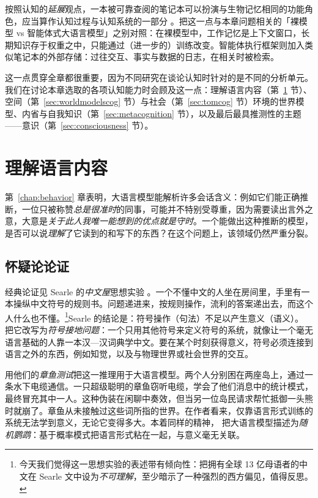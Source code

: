 按照认知的\emph{延展}观点，一本被可靠查阅的笔记本可以扮演与生物记忆相同的功能角色，应当算作认知过程与认知系统的一部分 \citep{clark1998extended}。把这一点与本章问题相关的「裸模型 vs 智能体式大语言模型」之别对照：在裸模型中，工作记忆是上下文窗口，长期知识存于权重之中，只能通过（进一步的）训练改变。智能体执行框架则加入类似笔记本的外部存储：过往交互、事实与数据的日志，在相关时被检索。

这一点贯穿全章都很重要，因为不同研究在谈论认知时针对的是不同的分析单元。我们在讨论本章选取的各项认知能力时会顾及这一点：理解语言内容（第~\ref{sec:understanding} 节）、空间（第~\ref{sec:worldmodelscog} 节）与社会（第~\ref{sec:tomcog} 节）环境的世界模型、内省与自我知识（第~\ref{sec:metacognition} 节），以及最后最具推测性的主题——意识（第~\ref{sec:consciousness} 节）。

\section{理解语言内容}\label{sec:understanding}
第~\ref{chap:behavior} 章表明，大语言模型能解析许多会话含义：例如它们能正确推断，一位只被称赞{\em 总是很准时}的同事，可能并不特别受尊重，因为需要读出言外之意，大意是\emph{关于此人我唯一能想到的优点就是守时}。一个能做出这种推断的模型，是否可以说\emph{理解}了它读到的和写下的东西？在这个问题上，该领域仍然严重分裂。

\subsection{怀疑论论证}
经典论证见 Searle 的\emph{中文屋}思想实验 \citep{searle1980minds}。一个不懂中文的人坐在房间里，手里有一本操纵中文符号的规则书。问题递进来，按规则操作，流利的答案递出去，而这个人什么也不懂。\footnote{今天我们觉得这一思想实验的表述带有倾向性：把拥有全球 13 亿母语者的中文在 Searle 文中设为\emph{不可理解}，至少暗示了一种强烈的西方偏见，值得反思。}Searle 的结论是：符号操作（句法）不足以产生意义（语义）。\citet{harnard1990symbol} 把它改写为\emph{符号接地问题}：一个只用其他符号来定义符号的系统，就像让一个毫无语言基础的人靠一本汉—汉词典学中文。要在某个时刻获得意义，符号必须连接到语言之外的东西，例如知觉，以及与物理世界或社会世界的交互。

\citet{bender-koller2020climbing} 用他们的\emph{章鱼测试}把这一推理用于大语言模型。两个人分别困在两座岛上，通过一条水下电缆通信。一只超级聪明的章鱼窃听电缆，学会了他们消息中的统计模式，最终冒充其中一人。这种伪装在闲聊中奏效，但当另一位岛民请求帮忙抵御一头熊时就崩了。章鱼从未接触过这些词所指的世界。在作者看来，仅靠语言形式训练的系统无法学到意义，无论它变得多大。本着同样的精神，\citet{bender2021dangers} 把大语言模型描述为\emph{随机鹦鹉}：基于概率模式把语言形式粘在一起，与意义毫无关联。

